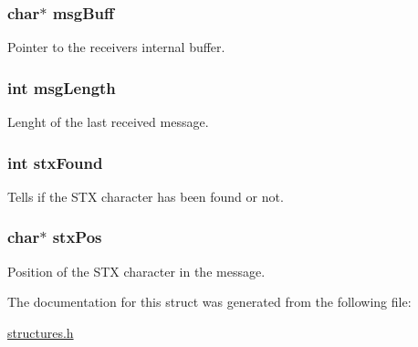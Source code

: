 \subsubsection[{\texorpdfstring{msg\+Buff}{msgBuff}}]{\setlength{\rightskip}{0pt plus 5cm}char$\ast$ msg\+Buff}\hypertarget{struct_m_p___r_e_c_e_i_v_e_r_s_t_r_a79e1507f8db9f4b76e641a8ad6f05729}{}\label{struct_m_p___r_e_c_e_i_v_e_r_s_t_r_a79e1507f8db9f4b76e641a8ad6f05729}


Pointer to the receiver\textquotesingle{}s internal buffer. 

\subsubsection[{\texorpdfstring{msg\+Length}{msgLength}}]{\setlength{\rightskip}{0pt plus 5cm}int msg\+Length}\hypertarget{struct_m_p___r_e_c_e_i_v_e_r_s_t_r_a470ff37d8c92bdd5c64fbdce0ad5231b}{}\label{struct_m_p___r_e_c_e_i_v_e_r_s_t_r_a470ff37d8c92bdd5c64fbdce0ad5231b}


Lenght of the last received message. 

\subsubsection[{\texorpdfstring{stx\+Found}{stxFound}}]{\setlength{\rightskip}{0pt plus 5cm}int stx\+Found}\hypertarget{struct_m_p___r_e_c_e_i_v_e_r_s_t_r_ab1326ba5ad761ac81725f9c02523030f}{}\label{struct_m_p___r_e_c_e_i_v_e_r_s_t_r_ab1326ba5ad761ac81725f9c02523030f}


Tells if the S\+TX character has been found or not. 

\subsubsection[{\texorpdfstring{stx\+Pos}{stxPos}}]{\setlength{\rightskip}{0pt plus 5cm}char$\ast$ stx\+Pos}\hypertarget{struct_m_p___r_e_c_e_i_v_e_r_s_t_r_ac1722435ceb1acbb5e33799c13e6564f}{}\label{struct_m_p___r_e_c_e_i_v_e_r_s_t_r_ac1722435ceb1acbb5e33799c13e6564f}


Position of the S\+TX character in the message. 



The documentation for this struct was generated from the following file\+:\begin{DoxyCompactItemize}
\item 
\hyperlink{structures_8h}{structures.\+h}\end{DoxyCompactItemize}
